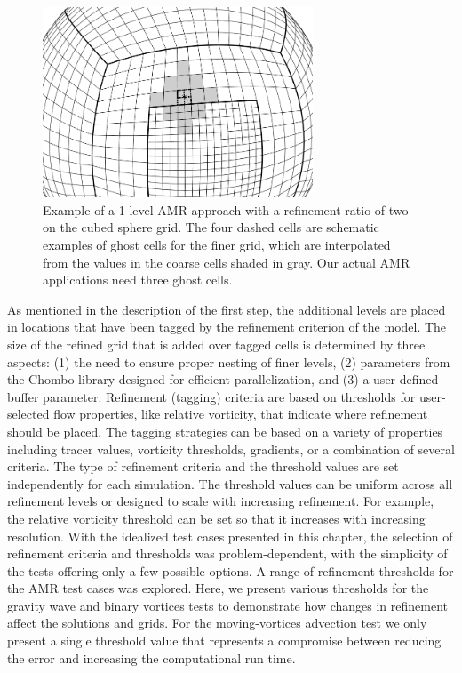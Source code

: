 \begin{figure}
    \centerline{%
    \noindent
    \includegraphics[width=19pc]{Chap1/cs_amr_ghostcell.png}}
    \caption{Example of a 1-level AMR approach with a refinement ratio of two
    on the cubed sphere grid.  The four dashed cells are schematic examples of ghost
    cells for the finer grid, which are interpolated from the values in
    the coarse cells shaded in gray. Our actual AMR applications need three ghost cells.}%
    \label{fig:ghost_cells}
\end{figure}

As mentioned in the description of the first step, the additional levels are placed in
locations that have been tagged by the refinement criterion of the
model.  The size of the refined grid that is added over tagged cells is
determined by three aspects: (1) the need to ensure proper nesting of finer levels,
(2) parameters from the Chombo library designed for efficient
parallelization, and (3) a user-defined buffer parameter.  Refinement (tagging)
criteria are based on thresholds for user-selected flow properties, like
relative vorticity, that indicate where refinement should be placed.
The tagging strategies can be based on a variety of properties including
tracer values, vorticity thresholds, gradients, or a combination of
several criteria.  The type of refinement criteria and the threshold
values are set independently for each simulation.  The threshold values
can be uniform across all refinement levels or designed to scale with
increasing refinement.  For example, the relative vorticity threshold can be set
so that it increases with increasing resolution. With the idealized
test cases presented in this chapter, the selection of refinement criteria
and thresholds was problem-dependent, with the simplicity of the
tests offering only a few possible options.  A range of refinement
thresholds for the AMR test cases was explored. Here, we present 
various thresholds for the gravity wave and binary vortices tests to
demonstrate how changes in refinement affect the solutions and grids.
For the moving-vortices advection test we only present a single 
threshold value that represents a compromise between reducing the
error and increasing the computational run time.

